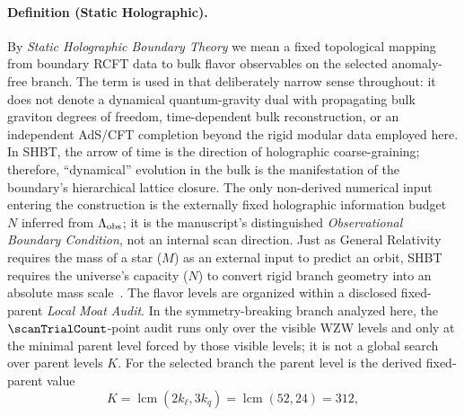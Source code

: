 \documentclass[11pt]{article}
\begin{document}
\paragraph{Definition (Static Holographic).}
By \emph{Static Holographic Boundary Theory} we mean a fixed topological mapping from boundary RCFT data to bulk flavor observables on the selected anomaly-free branch. The term is used in that deliberately narrow sense throughout: it does not denote a dynamical quantum-gravity dual with propagating bulk graviton degrees of freedom, time-dependent bulk reconstruction, or an independent AdS/CFT completion beyond the rigid modular data employed here. In SHBT, the arrow of time is the direction of holographic coarse-graining; therefore, ``dynamical'' evolution in the bulk is the manifestation of the boundary's hierarchical lattice closure. The only non-derived numerical input entering the construction is the externally fixed holographic information budget $N$ inferred from $\Lambda_{\rm obs}$; it is the manuscript's distinguished \emph{Observational Boundary Condition}, not an internal scan direction. Just as General Relativity requires the mass of a star ($M$) as an external input to predict an orbit, SHBT requires the universe's capacity ($N$) to convert rigid branch geometry into an absolute mass scale~\cite{cohen1999}. The flavor levels are organized within a disclosed fixed-parent \emph{Local Moat Audit}. In the symmetry-breaking branch analyzed here, the $\scanTrialCount$-point audit runs only over the visible WZW levels and only at the minimal parent level forced by those visible levels; it is not a global search over parent levels $K$. For the selected branch the parent level is the derived fixed-parent value
\begin{equation}
 K=\operatorname{lcm}(2k_{\ell},3k_q)=\operatorname{lcm}(52,24)=312,
\end{equation}
\end{document}
